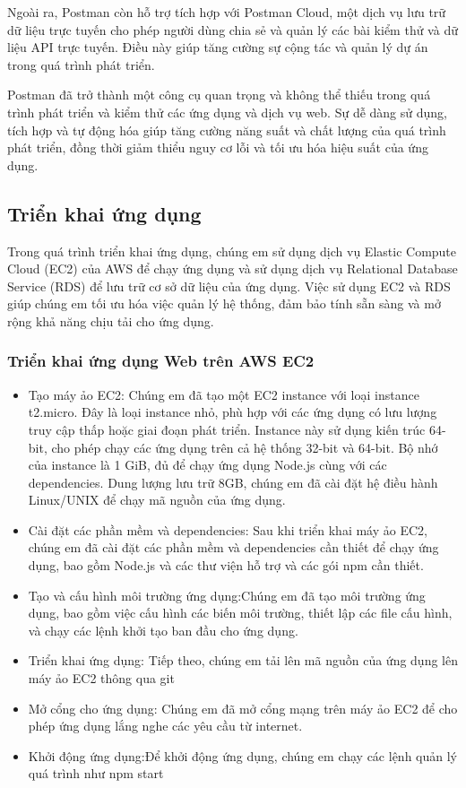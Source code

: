 Ngoài ra, Postman còn hỗ trợ tích hợp với Postman Cloud, một dịch vụ lưu trữ dữ liệu trực tuyến cho phép người dùng chia sẻ và quản lý các bài kiểm thử và dữ liệu API trực tuyến. Điều này giúp tăng cường sự cộng tác và quản lý dự án trong quá trình phát triển.

Postman đã trở thành một công cụ quan trọng và không thể thiếu trong quá trình phát triển và kiểm thử các ứng dụng và dịch vụ web. Sự dễ dàng sử dụng, tích hợp và tự động hóa giúp tăng cường năng suất và chất lượng của quá trình phát triển, đồng thời giảm thiểu nguy cơ lỗi và tối ưu hóa hiệu suất của ứng dụng.

\subsection{Triển khai ứng dụng}
Trong quá trình triển khai ứng dụng, chúng em sử dụng dịch vụ Elastic Compute
 Cloud (EC2) của AWS để chạy ứng dụng và sử dụng dịch vụ Relational Database Service
  (RDS) để lưu trữ cơ sở dữ liệu của ứng dụng. Việc sử dụng EC2 và RDS giúp
   chúng em tối ưu hóa việc quản lý hệ thống, đảm bảo tính sẵn sàng và
    mở rộng khả năng chịu tải cho ứng dụng.

\subsubsection{Triển khai ứng dụng Web trên AWS EC2}
\begin{itemize}
  \item Tạo máy ảo EC2: Chúng em đã tạo một EC2 instance với loại instance t2.micro. Đây là loại instance nhỏ, phù hợp với các ứng dụng có lưu lượng truy cập thấp hoặc giai đoạn phát triển. Instance này sử dụng kiến trúc 64-bit, cho phép chạy các ứng dụng trên cả hệ thống 32-bit và 64-bit. Bộ nhớ của instance là 1 GiB, đủ để chạy ứng dụng Node.js cùng với các dependencies. Dung lượng lưu trữ 8GB, chúng em đã cài đặt hệ điều hành Linux/UNIX để chạy mã nguồn của ứng dụng.
  \item Cài đặt các phần mềm và dependencies: Sau khi triển khai máy ảo EC2, chúng em đã cài đặt các phần mềm và dependencies cần thiết để chạy ứng dụng, bao gồm Node.js và các thư viện hỗ trợ và các gói npm cần thiết.
  \item Tạo và cấu hình môi trường ứng dụng:Chúng em đã tạo môi trường ứng dụng, bao gồm việc cấu hình các biến môi trường, thiết lập các file cấu hình, và chạy các lệnh khởi tạo ban đầu cho ứng dụng.
  \item Triển khai ứng dụng: Tiếp theo, chúng em tải lên mã nguồn của ứng dụng lên máy ảo EC2 thông qua git
  \item Mở cổng cho ứng dụng: Chúng em đã mở cổng mạng trên máy ảo EC2 để cho phép ứng dụng lắng nghe các yêu cầu từ internet.
  \item Khởi động ứng dụng:Để khởi động ứng dụng, chúng em chạy các lệnh quản lý quá trình như npm start
\end{itemize}

